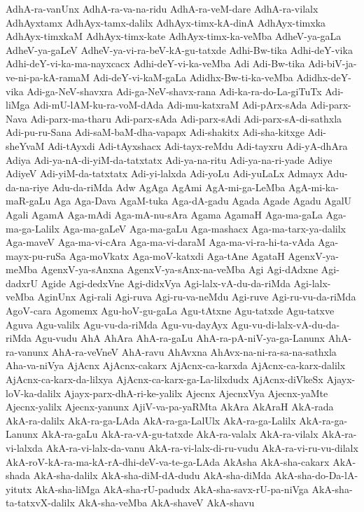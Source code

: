{AdhA-ra-vanUnx
AdhA-ra-va-na-ridu
AdhA-ra-veM-dare
AdhA-ra-vilalx
AdhAyxtamx
AdhAyx-tamx-dalilx
AdhAyx-timx-kA-dinA
AdhAyx-timxka
AdhAyx-timxkaM
AdhAyx-timx-kate
AdhAyx-timx-ka-veMba
AdheV-ya-gaLa
AdheV-ya-gaLeV
AdheV-ya-vi-ra-beV-kA-gu-tatxde
Adhi-Bw-tika
Adhi-deY-vika
Adhi-deY-vi-ka-ma-nayxcacx
Adhi-deY-vi-ka-veMba
Adi
Adi-Bw-tika
Adi-biV-ja-ve-ni-pa-kA-ramaM
Adi-deY-vi-kaM-gaLa
Adidhx-Bw-ti-ka-veMba
Adidhx-deY-vika
Adi-ga-NeV-shavxra
Adi-ga-NeV-shavx-rana
Adi-ka-ra-do-La-giTuTx
Adi-liMga
Adi-mU-lAM-ku-ra-voM-dAda
Adi-mu-katxraM
Adi-pArx-sAda
Adi-parx-Nava
Adi-parx-ma-tharu
Adi-parx-sAda
Adi-parx-sAdi
Adi-parx-sA-di-sathxla
Adi-pu-ru-Sana
Adi-saM-baM-dha-vapapx
Adi-shakitx
Adi-sha-kitxge
Adi-sheYvaM
Adi-tAyxdi
Adi-tAyxshacx
Adi-tayx-reMdu
Adi-tayxru
Adi-yA-dhAra
Adiya
Adi-ya-nA-di-yiM-da-tatxtatx
Adi-ya-na-ritu
Adi-ya-na-ri-yade
Adiye
AdiyeV
Adi-yiM-da-tatxtatx
Adi-yi-lalxda
Adi-yoLu
Adi-yuLaLx
Admayx
Adu-da-na-riye
Adu-da-riMda
Adw
AgAga
AgAmi
AgA-mi-ga-LeMba
AgA-mi-ka-maR-gaLu
Aga
Aga-Dava
AgaM-tuka
Aga-dA-gadu
Agada
Agade
Agadu
AgalU
Agali
AgamA
Aga-mAdi
Aga-mA-nu-sAra
Agama
AgamaH
Aga-ma-gaLa
Aga-ma-ga-Lalilx
Aga-ma-gaLeV
Aga-ma-gaLu
Aga-mashacx
Aga-ma-tarx-ya-dalilx
Aga-maveV
Aga-ma-vi-cAra
Aga-ma-vi-daraM
Aga-ma-vi-ra-hi-ta-vAda
Aga-mayx-pu-ruSa
Aga-moVkatx
Aga-moV-katxdi
Aga-tAne
AgataH
AgenxV-ya-meMba
AgenxV-ya-sAnxna
AgenxV-ya-sAnx-na-veMba
Agi
Agi-dAdxne
Agi-dadxrU
Agide
Agi-dedxVne
Agi-didxVya
Agi-lalx-vA-du-da-riMda
Agi-lalx-veMba
AginUnx
Agi-rali
Agi-ruva
Agi-ru-va-neMdu
Agi-ruve
Agi-ru-vu-da-riMda
AgoV-cara
Agomemx
Agu-hoV-gu-gaLa
Agu-tAtxne
Agu-tatxde
Agu-tatxve
Aguva
Agu-valilx
Agu-vu-da-riMda
Agu-vu-dayAyx
Agu-vu-di-lalx-vA-du-da-riMda
Agu-vudu
AhA
AhAra
AhA-ra-gaLu
AhA-ra-pA-niV-ya-ga-Lanunx
AhA-ra-vanunx
AhA-ra-veVneV
AhA-ravu
AhAvxna
AhAvx-na-ni-ra-sa-na-sathxla
Aha-va-niVya
AjAcnx
AjAcnx-cakarx
AjAcnx-ca-karxda
AjAcnx-ca-karx-dalilx
AjAcnx-ca-karx-da-lilxya
AjAcnx-ca-karx-ga-La-lilxdudx
AjAcnx-diVkeSx
Ajayx-loV-ka-dalilx
Ajayx-parx-dhA-ri-ke-yalilx
Ajecnx
AjecnxVya
Ajecnx-yaMte
Ajecnx-yalilx
Ajecnx-yanunx
AjiV-va-pa-yaRMta
AkAra
AkAraH
AkA-rada
AkA-ra-dalilx
AkA-ra-ga-LAda
AkA-ra-ga-LalUlx
AkA-ra-ga-Lalilx
AkA-ra-ga-Lanunx
AkA-ra-gaLu
AkA-ra-vA-gu-tatxde
AkA-ra-valalx
AkA-ra-vilalx
AkA-ra-vi-lalxda
AkA-ra-vi-lalx-da-vanu
AkA-ra-vi-lalx-di-ru-vudu
AkA-ra-vi-ru-vu-dilalx
AkA-roV-kA-ra-ma-kA-rA-dhi-deV-va-te-ga-LAda
AkAsha
AkA-sha-cakarx
AkA-shada
AkA-sha-dalilx
AkA-sha-diM-dA-dudu
AkA-sha-diMda
AkA-sha-do-Da-lA-yitutx
AkA-sha-liMga
AkA-sha-rU-padudx
AkA-sha-savx-rU-pa-niVga
AkA-sha-ta-tatxvX-dalilx
AkA-sha-veMba
AkA-shaveV
AkA-shavu
}
